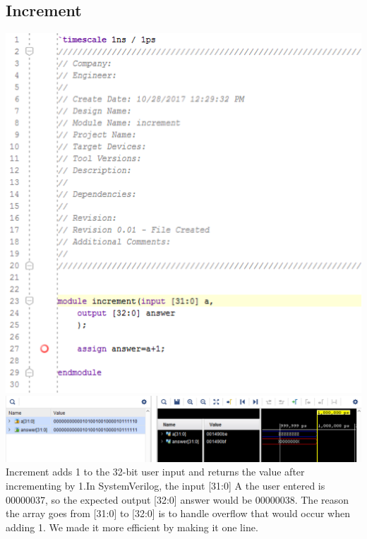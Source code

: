 \documentclass{article}
\begin{document}
\subsection{Increment}
\includegraphics[scale=0.5]{photos/increment}
\break
\includegraphics[scale=0.49]{photos/increment_simulation}
\break
Increment adds 1 to the 32-bit user input and returns the value after incrementing by 1.In SystemVerilog, the input [31:0] A the user entered is 00000037, so the expected output [32:0] answer would be 00000038. The reason the array goes from [31:0] to [32:0] is to handle overflow that would occur when adding 1. We made it more efficient by making it one line. 
\end{document}
